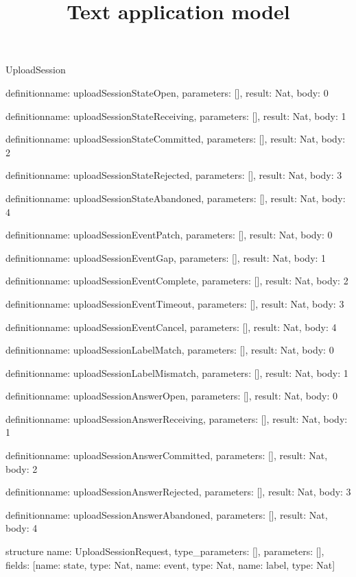 \begin{lexlean}{UploadSession}
\title{Text application model}
\begin{semanticmodule}
definition{name: uploadSessionStateOpen, parameters: [], result: Nat, body: 0}

definition{name: uploadSessionStateReceiving, parameters: [], result: Nat, body: 1}

definition{name: uploadSessionStateCommitted, parameters: [], result: Nat, body: 2}

definition{name: uploadSessionStateRejected, parameters: [], result: Nat, body: 3}

definition{name: uploadSessionStateAbandoned, parameters: [], result: Nat, body: 4}

definition{name: uploadSessionEventPatch, parameters: [], result: Nat, body: 0}

definition{name: uploadSessionEventGap, parameters: [], result: Nat, body: 1}

definition{name: uploadSessionEventComplete, parameters: [], result: Nat, body: 2}

definition{name: uploadSessionEventTimeout, parameters: [], result: Nat, body: 3}

definition{name: uploadSessionEventCancel, parameters: [], result: Nat, body: 4}

definition{name: uploadSessionLabelMatch, parameters: [], result: Nat, body: 0}

definition{name: uploadSessionLabelMismatch, parameters: [], result: Nat, body: 1}

definition{name: uploadSessionAnswerOpen, parameters: [], result: Nat, body: 0}

definition{name: uploadSessionAnswerReceiving, parameters: [], result: Nat, body: 1}

definition{name: uploadSessionAnswerCommitted, parameters: [], result: Nat, body: 2}

definition{name: uploadSessionAnswerRejected, parameters: [], result: Nat, body: 3}

definition{name: uploadSessionAnswerAbandoned, parameters: [], result: Nat, body: 4}

structure{
  name: UploadSessionRequest,
  type_parameters: [],
  parameters: [],
  fields: [{name: state, type: Nat}, {name: event, type: Nat}, {name: label, type: Nat}]
}


\end{semanticmodule}
\end{lexlean}
